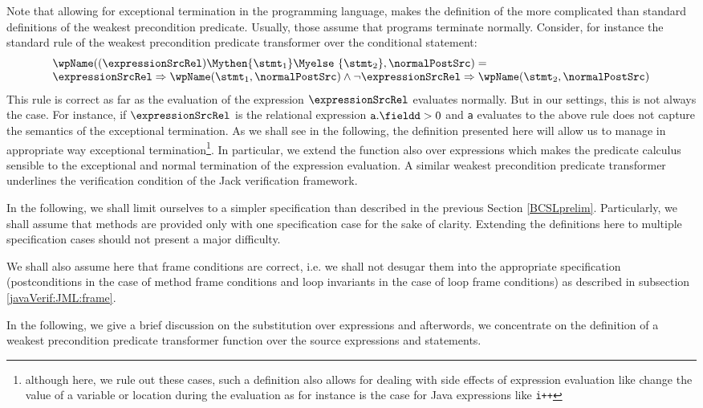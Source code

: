 Note that allowing for exceptional termination in the programming language,
 makes the definition of the \wpName{} more complicated  than standard definitions of the weakest precondition predicate. 
Usually, those assume that programs  terminate normally. 
Consider, for instance the standard rule of the weakest precondition predicate transformer over the conditional statement:
$$  \begin{array}{l}
\wpName((  \expressionSrcRel  )  \Mythen  \{ \stmt_1 \}   \Myelse \ \{ \stmt_2 \}, \normalPostSrc) = \\
  \expressionSrcRel \Rightarrow \wpName( \stmt_1, \normalPostSrc) \wedge
  \neg \expressionSrcRel \Rightarrow \wpName( \stmt_2, \normalPostSrc) \end{array}
$$
This rule is correct as far as the evaluation of the expression $\expressionSrcRel$ evaluates normally. But in our settings, this is not always the case.
For instance, if $ \expressionSrcRel$ is the relational expression $\mbox{\rm\texttt{a}}.\fieldd > 0$ and    \mbox{\rm\texttt{a}} evaluates to \Mynull{}
the above rule does not capture the semantics of the exceptional termination. As we shall see in the following, the definition presented here  will allow us to manage in  appropriate way
 exceptional termination\footnote{although here, we rule out these cases, such a definition also allows for dealing with side effects of expression evaluation like change
 the value of a variable or location during the evaluation as for instance is the case for Java expressions like \lstinline!i++!}.
 In particular, we extend the \wpName{} function also over expressions which makes the predicate calculus sensible to the exceptional and normal termination of the 
expression evaluation. A similar  weakest precondition predicate transformer underlines the verification condition of
 the Jack verification framework.


In the following, we shall limit ourselves to a simpler specification than described in the previous Section \ref{BCSLprelim}.
Particularly, we shall assume that  methods are provided only with one specification case for the sake of clarity.
 Extending the definitions here to multiple specification  cases should not present a major difficulty.

We shall also assume here that frame conditions are correct, i.e. we shall not desugar them  into the appropriate specification 
(postconditions in the  case of method frame conditions and loop invariants in the case of  loop frame conditions) as described in
subsection \ref{javaVerif:JML:frame}. 

In the following, we give a brief discussion on the substitution over expressions and afterwords, we concentrate
 on the definition of a weakest precondition predicate transformer function over the source expressions and statements.
